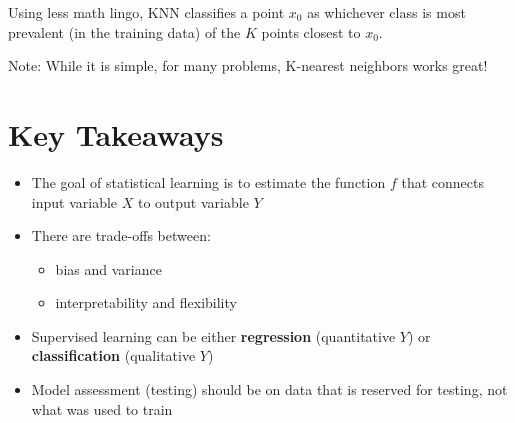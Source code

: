 Using less math lingo, KNN classifies a point \(x_0\) as whichever class
is most prevalent (in the training data) of the \(K\) points closest to
\(x_0\).

Note: While it is simple, for many problems, K-nearest neighbors works
great!

\section*{Key Takeaways}\label{key-takeaways}

\begin{itemize}
\tightlist
\item  The goal of statistical learning is to estimate the function \(f\)  that connects input variable \(X\) to output variable \(Y\)
\item  There are trade-offs between:

  \begin{itemize}
  \tightlist
  \item   bias and variance
  \item   interpretability and flexibility
  \end{itemize}
\item  Supervised learning can be either \textbf{regression} (quantitative  \(Y\)) or \textbf{classification} (qualitative \(Y\))
\item  Model assessment (testing) should be on data that is reserved for  testing, not what was used to train
\end{itemize}

